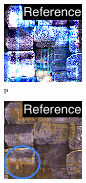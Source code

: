 \begin{figure}[]
\begin{subfigure}{\textwidth}
\begin{subfigure}{0.19\textwidth}
            \includegraphics[width=\textwidth]{images/04-experiment03/staircase_illum/beams/pixel_im_label.jpg}
            \caption{\(\bm{p}\)}
            \label{fig:ex03-staircase_illum-beams-pixel_im}
        \end{subfigure}
        \hfill
        \begin{subfigure}{0.19\textwidth}
            \centering
            \includegraphics[width=\textwidth]{images/04-experiment03/staircase_illum/beams/pixel_proj_highlighted2.jpg}

\end{subfigure}
\end{subfigure}
\end{figure}
